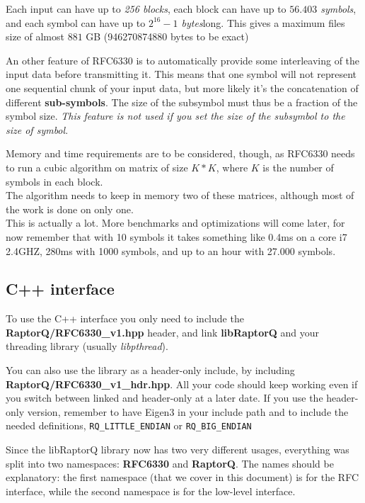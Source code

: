 \documentclass[11pt,a4paper]{refart}
\begin{document}
Each input can have up to \textit{256 blocks}, each block can have up to \textit{$56.403$ symbols}, and each
symbol can have up to \textit{$2^{16}-1$ bytes}long. This gives a maximum files size of almost $881$ GB (946270874880 bytes to be exact)

An other feature of RFC6330 is to automatically provide some interleaving of the input data before transmitting it. This means that one symbol will not
represent one sequential chunk of your input data, but more likely it's the concatenation of different \textbf{sub-symbols}. The size of the subsymbol must thus
be a fraction of the symbol size. \textit{This feature is not used if you set the size of the subsymbol to the size of symbol}.


Memory and time requirements are to be considered, though, as RFC6330 needs to run a cubic algorithm on matrix of size $K*K$, where $K$ is the number of
symbols in each block.\\
The algorithm needs to keep in memory two of these matrices, although most of the work is done on only one.\\
This is actually a lot. More benchmarks and optimizations will come later, for now remember that with 10 symbols it takes something like 0.4ms on a core i7 2.4GHZ, 280ms with 1000 symbols, and up to an hour with 27.000 symbols.


\subsection{C++ interface}
To use the C++ interface you only need to include the \textbf{RaptorQ/RFC6330\_v1.hpp} header, and link \textbf{libRaptorQ} and your threading library (usually
\textit{libpthread}).

You can also use the library as a header-only include, by including \textbf{RaptorQ/RFC6330\_v1\_hdr.hpp}. All your code should keep working even if you switch between linked and header-only at a later date. If you use the header-only version, remember to have Eigen3 in your include path and to include the needed definitions, \texttt{RQ\_LITTLE\_ENDIAN} or \texttt{RQ\_BIG\_ENDIAN}

Since the libRaptorQ library now has two very different usages, everything was split into two namespaces: \textbf{RFC6330} and \textbf{RaptorQ}. The names should be explanatory: the first namespace (that we cover in this document) is for the RFC interface, while the second namespace is for the low-level interface.
\end{document}
